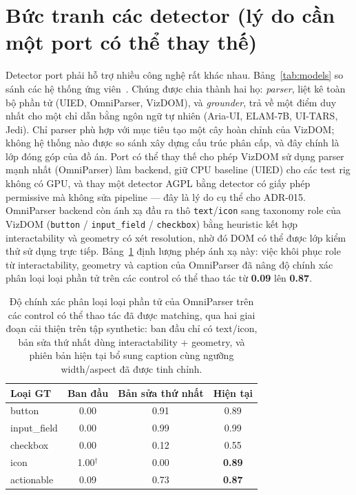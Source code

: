 \documentclass[11pt,a4paper]{report}
\newcommand{\code}[1]{\texttt{#1}}
\begin{document}
\section{Bức tranh các detector (lý do cần một port có thể thay thế)}
Detector port phải hỗ trợ nhiều công nghệ rất khác nhau. Bảng~\ref{tab:models} so sánh
các hệ thống ứng viên~\cite{xie2020uied,omniparser2024,ariaui2024,elam7b,uitars2025,osworldg}.
Chúng được chia thành hai họ: \emph{parser}, liệt kê toàn bộ phần tử (UIED, OmniParser,
VizDOM), và \emph{grounder}, trả về một điểm duy nhất cho một chỉ dẫn bằng ngôn ngữ tự
nhiên (Aria-UI, ELAM-7B, UI-TARS, Jedi). Chỉ parser phù hợp với mục tiêu tạo một cây hoàn chỉnh
của VizDOM; không hệ thống nào được so sánh xây dựng cấu trúc phân cấp, và đây chính là
lớp đóng góp của đồ án. Port có thể thay thế cho phép VizDOM sử dụng parser mạnh nhất
(OmniParser) làm backend, giữ CPU baseline (UIED) cho các test rig không có GPU, và thay
một detector AGPL bằng detector có giấy phép permissive mà không sửa pipeline --- đây là
lý do cụ thể cho ADR-015. OmniParser backend còn ánh xạ đầu ra thô \code{text}/\code{icon}
sang taxonomy role của VizDOM (\code{button} / \code{input\_field} / \code{checkbox})
bằng heuristic kết hợp interactability và geometry có xét resolution, nhờ đó DOM có thể
được lớp kiểm thử sử dụng trực tiếp. Bảng~\ref{tab:arc42typeacc} định lượng phép ánh xạ
này: việc khôi phục role từ interactability, geometry và caption của OmniParser đã nâng độ
chính xác phân loại loại phần tử trên các control có thể thao tác từ \textbf{0.09} lên
\textbf{0.87}.

\begin{table}[H]
  \centering\footnotesize
  \caption{Độ chính xác phân loại loại phần tử của OmniParser trên các control có thể
  thao tác đã được matching, qua hai giai đoạn cải thiện trên tập synthetic: ban đầu
  chỉ có text/icon, bản sửa thứ nhất dùng interactability + geometry, và phiên bản hiện
  tại bổ sung caption cùng ngưỡng width/aspect đã được tinh chỉnh.}
  \label{tab:arc42typeacc}
  \begin{tabular}{@{}lccc@{}}
    \toprule
    Loại GT & Ban đầu & Bản sửa thứ nhất & Hiện tại \\
    \midrule
    button       & 0.00 & 0.91 & 0.89 \\
    input\_field & 0.00 & 0.99 & 0.99 \\
    checkbox     & 0.00 & 0.12 & 0.55 \\
    icon         & 1.00$^\dagger$ & 0.00 & \textbf{0.89} \\
    \midrule
    actionable   & 0.09 & 0.73 & \textbf{0.87} \\
    \bottomrule
  \end{tabular}
\end{table}
\end{document}
